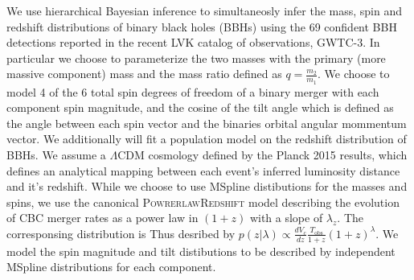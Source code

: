 We use hierarchical Bayesian inference to simultaneosly infer the mass, spin and redshift distributions of binary black holes (BBHs) using 
the 69 confident BBH detections reported in the recent LVK catalog of observations, GWTC-3. In particular we choose to parameterize the two
masses with the primary (more massive component) mass and the mass ratio defined as $q=\frac{m_2}{m_1}$. We choose to model 4 of the 6 total 
spin degrees of freedom of a binary merger with each component spin magnitude, and the cosine of the tilt angle which is defined as the angle 
between each spin vector and the binaries orbital angular mommentum vector. We additionally will fit a population model on the redshift distribution
of BBHs. We assume a $\Lambda\mathrm{CDM}$ cosmology defined by the Planck 2015 results, which defines an analytical mapping between each event's inferred
luminosity distance and it's redshift. While we choose to use MSpline distibutions for the masses and spins, we use the canonical \textsc{PowrerlawRedshift}
model describing the evolution of CBC merger rates as a power law in $(1+z)$ with a slope of $\lambda_z$. The corresponsing distribution is Thus
desribed by $p(z|\lambda)\propto \frac{dV_c}{dz} \frac{T_\mathrm{obs}}{1+z} (1+z)^\lambda$. We model the spin magnitude and tilt distibutions to be 
described by independent MSpline distributions for each component. 
